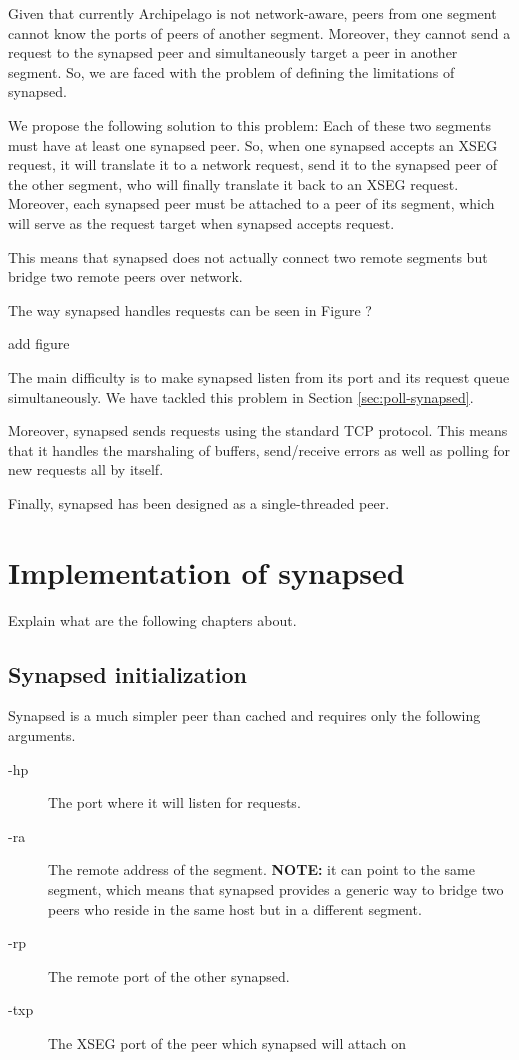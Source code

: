 Given that currently Archipelago is not network-aware, peers from one segment 
cannot know the ports of peers of another segment. Moreover, they cannot send a 
request to the synapsed peer and simultaneously target a peer in another 
segment. So, we are faced with the problem of defining the limitations of 
synapsed.

We propose the following solution to this problem: Each of these two segments 
must have at least one synapsed peer. So, when one synapsed accepts an XSEG 
request, it will translate it to a network request, send it to the synapsed 
peer of the other segment, who will finally translate it back to an XSEG 
request.  Moreover, each synapsed peer must be attached to a peer of its 
segment, which will serve as the request target when synapsed accepts request.  

This means that synapsed does not actually connect two remote segments
but bridge two remote peers over network.

The way synapsed handles requests can be seen in Figure ?

\fixme add figure

The main difficulty is to make synapsed listen from its port and its request 
queue simultaneously. We have tackled this problem in Section 
\ref{sec:poll-synapsed}.

Moreover, synapsed sends requests using the standard TCP protocol.  This means 
that it handles the marshaling of buffers, send/receive errors as well as 
polling for new requests all by itself.

Finally, synapsed has been designed as a single-threaded peer.

\section{Implementation of synapsed}

\todo Explain what are the following chapters about.

\subsection{Synapsed initialization}

Synapsed is a much simpler peer than cached and requires only the following 
arguments.

\begin{description}
	\item[-hp] The port where it will listen for requests.
	\item[-ra] The remote address of the segment. \textbf{NOTE:} it can 
		point to the same segment, which means that synapsed provides a 
		generic way to bridge two peers who reside in the same host but 
		in a different segment.
	\item[-rp] The remote port of the other synapsed.
	\item[-txp] The XSEG port of the peer which synapsed will attach on
\end{description}

